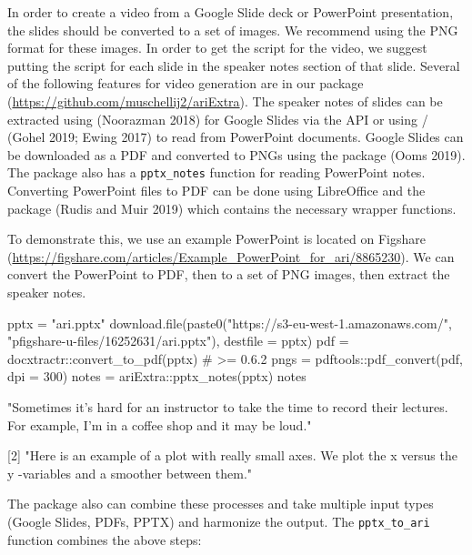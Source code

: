 In order to create a video from a Google Slide deck or PowerPoint
presentation, the slides should be converted to a set of images. We
recommend using the PNG format for these images. In order to get the
script for the video, we suggest putting the script for each slide in
the speaker notes section of that slide. Several of the following
features for video generation are in our package 
(\url{https://github.com/muschellij2/ariExtra}). The speaker notes of
slides can be extracted using  (Noorazman 2018)
for Google Slides via the API or using
/ (Gohel 2019; Ewing 2017) to read
from PowerPoint documents. Google Slides can be downloaded as a PDF and
converted to PNGs using the  package (Ooms 2019). The
 package also has a \texttt{pptx\_notes} function for
reading PowerPoint notes. Converting PowerPoint files to PDF can be done
using LibreOffice and the  package (Rudis and Muir
2019) which contains the necessary wrapper functions.

To demonstrate this, we use an example PowerPoint is located on Figshare
(\url{https://figshare.com/articles/Example_PowerPoint_for_ari/8865230}).
We can convert the PowerPoint to PDF, then to a set of PNG images, then
extract the speaker notes.

\begin{Schunk}
\begin{Sinput}
pptx = "ari.pptx"
download.file(paste0("https://s3-eu-west-1.amazonaws.com/", 
                     "pfigshare-u-files/16252631/ari.pptx"),
              destfile = pptx)
pdf = docxtractr::convert_to_pdf(pptx) # >= 0.6.2 
pngs = pdftools::pdf_convert(pdf, dpi = 300)
notes = ariExtra::pptx_notes(pptx)
notes
\end{Sinput}
\end{Schunk}

\begin{Schunk}
\begin{Soutput}
[1] "Sometimes it’s hard for an instructor to take the time to record their lectures.
For example, I’m in a coffee shop and it may be loud."

[2] "Here is an example of a plot with really small axes.  We plot the x versus the y
-variables and a smoother between them."
\end{Soutput}
\end{Schunk}

The  package also can combine these processes and take
multiple input types (Google Slides, PDFs, PPTX) and harmonize the
output. The \texttt{pptx\_to\_ari} function combines the above steps:

